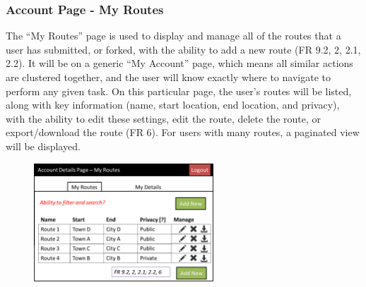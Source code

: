 \newpage 
\subsubsection{Account Page - My Routes}
The ``My Routes'' page is used to display and manage all of the routes that a user has submitted, or forked, with the ability to add a new route (FR 9.2, 2, 2.1, 2.2). It will be on a generic ``My Account'' page, which means all similar actions are clustered together, and the user will know exactly where to navigate to perform any given task. On this particular page, the user's routes will be listed, along with key information (name, start location, end location, and privacy), with the ability to edit these settings, edit the route, delete the route, or export/download the route (FR 6). For users with many routes, a paginated view will be displayed.
\begin{figure}[!ht]
	\begin{center}
		\includegraphics[width=0.6\textwidth]{images/ui-myroutes.png}
	\end{center}
	\vspace{-6mm}
\end{figure}\ \\

